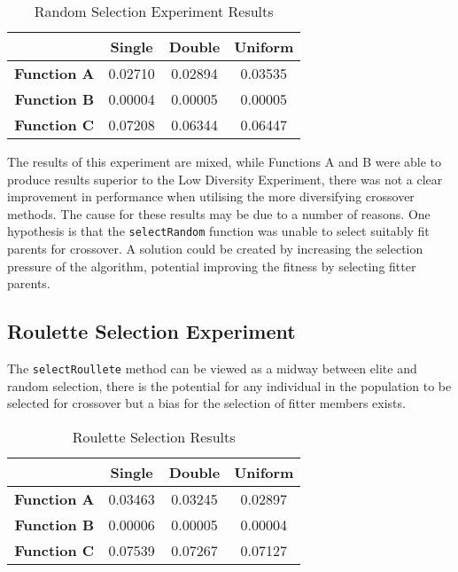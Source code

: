 			\begin{table}[h]
				\centering
				\caption{Random Selection Experiment Results}
				\label{tab_rand}
				\begin{tabular}{|c|c|c|c|}
					\hline
					\textbf{}           & \textbf{Single} & \textbf{Double} & \textbf{Uniform} \\ \hline
					\textbf{Function A} & 0.02710         & 0.02894         & 0.03535          \\ \hline
					\textbf{Function B} & 0.00004         & 0.00005         & 0.00005          \\ \hline
					\textbf{Function C} & 0.07208         & 0.06344         & 0.06447          \\ \hline
				\end{tabular}
			\end{table}
		
		The results of this experiment are mixed, while Functions A and B were able to produce results superior to the Low Diversity Experiment, there was not a clear improvement in performance when utilising the more diversifying crossover methods. The cause for these results may be due to a number of reasons. One hypothesis is that the \texttt{selectRandom} function  was unable to select suitably fit parents for crossover. A solution could be created by increasing the selection pressure of the algorithm, potential improving the fitness by selecting fitter parents. 
									
		\subsection{Roulette Selection Experiment}
			The \texttt{selectRoullete} method can be viewed as a midway between elite and random selection, there is the potential for any individual in the population to be selected for crossover but a bias for the selection of fitter members exists.
			
			\begin{table}[h]
				\centering
				\caption{Roulette Selection Results}
				\label{tab_rou}
				\begin{tabular}{|c|c|c|c|}
					\hline
					& \textbf{Single} & \textbf{Double} & \textbf{Uniform} \\ \hline
					\textbf{Function A} & 0.03463         & 0.03245         & 0.02897          \\ \hline
					\textbf{Function B} & 0.00006         & 0.00005         & 0.00004          \\ \hline
					\textbf{Function C} & 0.07539         & 0.07267         & 0.07127          \\ \hline
				\end{tabular}
			\end{table}
		
